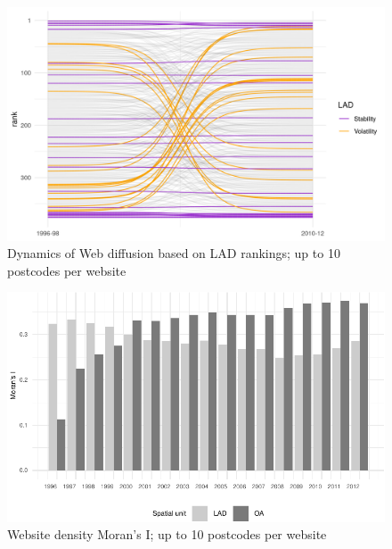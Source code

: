 \documentclass[
  authoryear,
  preprint,
  3p]{elsarticle}
\begin{document}
\begin{figure}[H]

{\centering \includegraphics[width=1\textwidth,height=\textheight]{../../outputs/ranks/web_per_firm2000_2012_only0595_av_10.png}

}

\caption{\label{rank10}Dynamics of Web diffusion based on LAD rankings;
up to 10 postcodes per website}

\end{figure}%

\begin{figure}[H]

{\centering \includegraphics[width=1\textwidth,height=\textheight]{tranos2025_files/figure-pdf/morani10-1.pdf}

}

\caption{\label{morani10}Website density Moran's I; up to 10 postcodes
per website}

\end{figure}%
\end{document}
